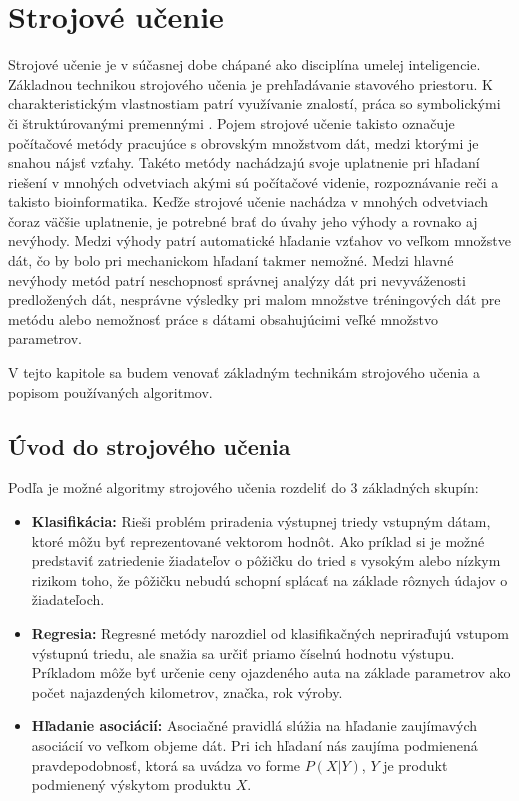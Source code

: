 \chapter{Strojové učenie}
\label{ml}
Strojové učenie je v súčasnej dobe chápané ako disciplína umelej inteligencie. Základnou technikou strojového učenia je prehľadávanie stavového priestoru. K charakteristickým vlastnostiam patrí využívanie znalostí, práca so symbolickými či štruktúrovanými premennými \cite{machine_learning}. Pojem strojové učenie takisto označuje počítačové metódy pracujúce s obrovským množstvom dát, medzi ktorými je snahou nájsť vzťahy. Takéto metódy nachádzajú svoje uplatnenie pri hľadaní riešení v mnohých odvetviach akými sú počítačové videnie, rozpoznávanie reči a takisto bioinformatika. Keďže strojové učenie nachádza v mnohých odvetviach čoraz väčšie uplatnenie, je potrebné brať do úvahy jeho výhody a rovnako aj nevýhody. Medzi výhody patrí automatické hľadanie vzťahov vo veľkom množstve dát, čo by bolo pri mechanickom hľadaní takmer nemožné. Medzi hlavné nevýhody metód patrí neschopnosť správnej analýzy dát pri nevyváženosti predložených dát, nesprávne výsledky pri malom množstve tréningových dát pre metódu alebo nemožnosť práce s dátami obsahujúcimi veľké množstvo parametrov.

V tejto kapitole sa budem venovať základným technikám strojového učenia a popisom používaných algoritmov. 

\section{Úvod do strojového učenia}

Podľa \cite{alpaydin} je možné algoritmy strojového učenia rozdeliť do 3 základných skupín:
\begin{itemize}
	\item \textbf{Klasifikácia:} Rieši problém priradenia výstupnej triedy vstupným dátam, ktoré môžu byť reprezentované vektorom hodnôt. Ako príklad si je možné predstaviť zatriedenie žiadateľov o pôžičku do tried s vysokým alebo nízkym rizikom toho, že pôžičku nebudú schopní splácať na základe rôznych údajov o žiadateľoch.
	\item \textbf{Regresia:} Regresné metódy narozdiel od klasifikačných nepriraďujú vstupom výstupnú triedu, ale snažia sa určiť priamo číselnú hodnotu výstupu. Príkladom môže byť určenie ceny ojazdeného auta na základe parametrov ako počet najazdených kilometrov, značka, rok výroby.
	\item \textbf{Hľadanie asociácií:} Asociačné pravidlá slúžia na hľadanie zaujímavých asociácií vo veľkom objeme dát. Pri ich hľadaní nás zaujíma podmienená pravdepodobnosť, ktorá sa uvádza vo forme $P(X|Y)$, $Y$ je produkt podmienený výskytom produktu $X$. 
\end{itemize}


